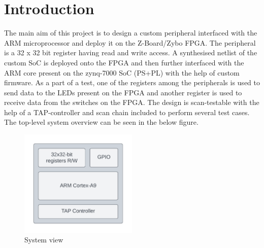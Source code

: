 \vspace{0pt} %
\section{Introduction}
The main aim of this project is to design a custom peripheral interfaced with the ARM microprocessor and deploy it on the Z-Board/Zybo FPGA. The peripheral is a 32 x 32 bit register having read and write access. A synthesised netlist of the custom SoC is deployed onto the FPGA and then further interfaced with the ARM core present on the zynq-7000 SoC (PS+PL) with the help of custom firmware. As a part of a test, one of the registers among the peripherals is used to send data to the LEDs present on the FPGA and another register is used to receive data from the switches on the FPGA. The design is scan-testable with the help of a TAP-controller and scan chain included to perform several test cases. The top-level system overview can be seen in the below figure.

\vspace{-15pt} %

\begin{figure}[h] %
  \centering
  \setlength{\abovecaptionskip}{-10pt} %
  \setlength{\belowcaptionskip}{-10pt} %
  \includegraphics[width=0.5\textwidth]{Image/Block Diagram.png} %
  \caption{System view}
  \label{Figure 1 : System view}
\end{figure}

